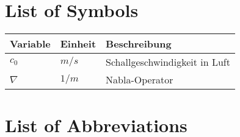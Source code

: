 








\ifnomenklatur

\else
\chapter*{List of Symbols}
%
%
%
%
%
\begin{longtable}[t]{p{}p{}p{}}
	\textbf{Variable}  & \textbf{Einheit} & \textbf{Beschreibung}\\
	\midrule
	$c_0$ & $m/s$ & Schallgeschwindigkeit in Luft \\
	$\nabla$ & $1/m$ & Nabla-Operator \\

	
\end{longtable}


{\let\clearpage\relax \chapter*{List of Abbreviations}}

